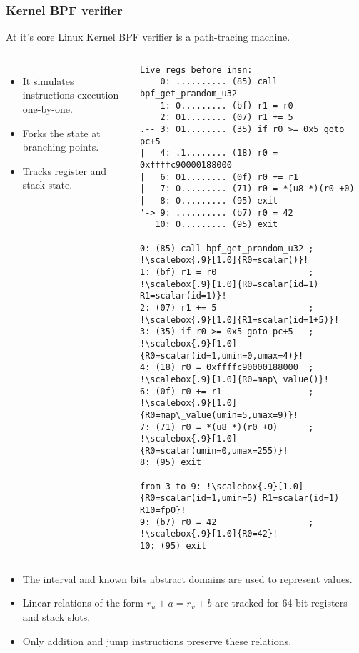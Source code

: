 \documentclass{beamer}
\begin{document}
\begin{frame}
  \frametitle{Kernel BPF verifier}

  At it's core Linux Kernel BPF verifier is a path-tracing machine.
  \begin{columns}[t]
    \scriptsize
    \begin{itemize}
    \item It simulates instructions execution one-by-one.
    \item Forks the state at branching points.
    \item Tracks register and stack state.
    \end{itemize}
    \begin{verbatim}
Live regs before insn:
    0: .......... (85) call bpf_get_prandom_u32
    1: 0......... (bf) r1 = r0
    2: 01........ (07) r1 += 5
.-- 3: 01........ (35) if r0 >= 0x5 goto pc+5
|   4: .1........ (18) r0 = 0xffffc90000188000
|   6: 01........ (0f) r0 += r1
|   7: 0......... (71) r0 = *(u8 *)(r0 +0)
|   8: 0......... (95) exit
'-> 9: .......... (b7) r0 = 42
   10: 0......... (95) exit

0: (85) call bpf_get_prandom_u32 ; !\scalebox{.9}[1.0]{R0=scalar()}!
1: (bf) r1 = r0                  ; !\scalebox{.9}[1.0]{R0=scalar(id=1) R1=scalar(id=1)}!
2: (07) r1 += 5                  ; !\scalebox{.9}[1.0]{R1=scalar(id=1+5)}!
3: (35) if r0 >= 0x5 goto pc+5   ; !\scalebox{.9}[1.0]{R0=scalar(id=1,umin=0,umax=4)}!
4: (18) r0 = 0xffffc90000188000  ; !\scalebox{.9}[1.0]{R0=map\_value()}!
6: (0f) r0 += r1                 ; !\scalebox{.9}[1.0]{R0=map\_value(umin=5,umax=9)}!
7: (71) r0 = *(u8 *)(r0 +0)      ; !\scalebox{.9}[1.0]{R0=scalar(umin=0,umax=255)}!
8: (95) exit

from 3 to 9: !\scalebox{.9}[1.0]{R0=scalar(id=1,umin=5) R1=scalar(id=1) R10=fp0}!
9: (b7) r0 = 42                  ; !\scalebox{.9}[1.0]{R0=42}!
10: (95) exit      
    \end{verbatim}
  \end{columns}

  \framebreak

    \scriptsize
    \begin{itemize}
    \item The interval and known bits abstract domains are used to
      represent values.
    \item Linear relations of the form $r_u + a = r_v + b$ are tracked
      for 64-bit registers and stack slots.
    \item Only addition and jump instructions preserve these relations.
    \end{itemize}


\end{frame}
\end{document}
